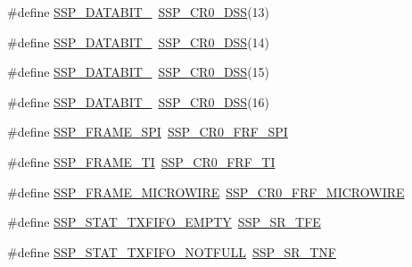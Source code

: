 \begin{DoxyCompactItemize}
\item 
\#define \hyperlink{group___s_s_p___public___macros_ga6e7696139bcc6ffbea4c7633db5691bc}{\-S\-S\-P\-\_\-\-D\-A\-T\-A\-B\-I\-T\-\_}~\hyperlink{group___s_s_p___private___macros_ga691ba9dbc6a0722a81ed4734c7f7ac8f}{\-S\-S\-P\-\_\-\-C\-R0\-\_\-\-D\-S\-S}(13)
\item 
\#define \hyperlink{group___s_s_p___public___macros_ga23092c43aa47e79b5c540e1c8bcfb43f}{\-S\-S\-P\-\_\-\-D\-A\-T\-A\-B\-I\-T\-\_}~\hyperlink{group___s_s_p___private___macros_ga691ba9dbc6a0722a81ed4734c7f7ac8f}{\-S\-S\-P\-\_\-\-C\-R0\-\_\-\-D\-S\-S}(14)
\item 
\#define \hyperlink{group___s_s_p___public___macros_gafb96efb2ad42b6804003beb416bf513f}{\-S\-S\-P\-\_\-\-D\-A\-T\-A\-B\-I\-T\-\_}~\hyperlink{group___s_s_p___private___macros_ga691ba9dbc6a0722a81ed4734c7f7ac8f}{\-S\-S\-P\-\_\-\-C\-R0\-\_\-\-D\-S\-S}(15)
\item 
\#define \hyperlink{group___s_s_p___public___macros_ga8a5285b118c9dc1a7f2ce6c4caa3b962}{\-S\-S\-P\-\_\-\-D\-A\-T\-A\-B\-I\-T\-\_}~\hyperlink{group___s_s_p___private___macros_ga691ba9dbc6a0722a81ed4734c7f7ac8f}{\-S\-S\-P\-\_\-\-C\-R0\-\_\-\-D\-S\-S}(16)
\item 
\#define \hyperlink{group___s_s_p___public___macros_gae60b1441f3ecdb03755304c320d89337}{\-S\-S\-P\-\_\-\-F\-R\-A\-M\-E\-\_\-\-S\-P\-I}~\hyperlink{group___s_s_p___private___macros_ga4f0f58a8f4b87af0f18e84b981c31a74}{\-S\-S\-P\-\_\-\-C\-R0\-\_\-\-F\-R\-F\-\_\-\-S\-P\-I}
\item 
\#define \hyperlink{group___s_s_p___public___macros_gacc8028fc65d645b5c0ac06863bc8cd9c}{\-S\-S\-P\-\_\-\-F\-R\-A\-M\-E\-\_\-\-T\-I}~\hyperlink{group___s_s_p___private___macros_ga54c718a1a75a1e5e06417b9f8267ee27}{\-S\-S\-P\-\_\-\-C\-R0\-\_\-\-F\-R\-F\-\_\-\-T\-I}
\item 
\#define \hyperlink{group___s_s_p___public___macros_gab908ae3d749411618396107e2e0c635e}{\-S\-S\-P\-\_\-\-F\-R\-A\-M\-E\-\_\-\-M\-I\-C\-R\-O\-W\-I\-R\-E}~\hyperlink{group___s_s_p___private___macros_ga7ca858fcf0f529a38e1e1bf0a69d4486}{\-S\-S\-P\-\_\-\-C\-R0\-\_\-\-F\-R\-F\-\_\-\-M\-I\-C\-R\-O\-W\-I\-R\-E}
\item 
\#define \hyperlink{group___s_s_p___public___macros_gadb3e00bb8249856e4ace28ea931bb177}{\-S\-S\-P\-\_\-\-S\-T\-A\-T\-\_\-\-T\-X\-F\-I\-F\-O\-\_\-\-E\-M\-P\-T\-Y}~\hyperlink{group___s_s_p___private___macros_gaa56cadbf2604cf3d9706f3583be99f63}{\-S\-S\-P\-\_\-\-S\-R\-\_\-\-T\-F\-E}
\item 
\#define \hyperlink{group___s_s_p___public___macros_ga9a88c97aaba7a01be0842d099cf7958c}{\-S\-S\-P\-\_\-\-S\-T\-A\-T\-\_\-\-T\-X\-F\-I\-F\-O\-\_\-\-N\-O\-T\-F\-U\-L\-L}~\hyperlink{group___s_s_p___private___macros_gabde0199183f2a747cd039c66d40cf534}{\-S\-S\-P\-\_\-\-S\-R\-\_\-\-T\-N\-F}

\end{DoxyCompactItemize}
